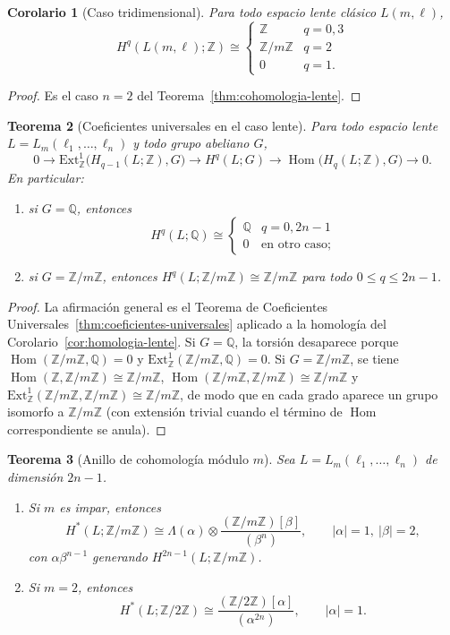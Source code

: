 \documentclass[11pt,a4paper]{article}
\theoremstyle{plain}
\newtheorem{theorem}{Teorema}[section]
\newtheorem{corollary}[theorem]{Corolario}
\theoremstyle{definition}
\theoremstyle{remark}
\newcommand{\ZZ}{\mathbb Z}
\newcommand{\QQ}{\mathbb Q}
\DeclareMathOperator{\Hom}{Hom}
\begin{document}
\begin{corollary}[Caso tridimensional]
\label{cor:cohomologia-lente-3d}
Para todo espacio lente clásico $L(m,\ell)$,
\[
H^q(L(m,\ell);\ZZ)\cong\begin{cases}\ZZ & q=0,3\\ \ZZ/m\ZZ & q=2\\0 & q=1.\end{cases}
\]
\end{corollary}

\begin{proof}
Es el caso $n=2$ del Teorema~\ref{thm:cohomologia-lente}.
\end{proof}

\begin{theorem}[Coeficientes universales en el caso lente]
\label{thm:ucl-lente}
Para todo espacio lente $L=L_m(\ell_1,\dots,\ell_n)$ y todo grupo abeliano
$G$,
\[
0\to\mathrm{Ext}^1_\ZZ\big(H_{q-1}(L;\ZZ),G\big)\to H^q(L;G)\to\Hom\big(H_q(L;\ZZ),G\big)\to0.
\]
En particular:
\begin{enumerate}[label=(\roman*)]
\item si $G=\QQ$, entonces
\[
H^q(L;\QQ)\cong\begin{cases}\QQ & q=0,2n-1\\0 & \text{en otro caso;}\end{cases}
\]
\item si $G=\ZZ/m\ZZ$, entonces $H^q(L;\ZZ/m\ZZ)\cong\ZZ/m\ZZ$ para todo
$0\le q\le2n-1$.
\end{enumerate}
\end{theorem}

\begin{proof}
La afirmación general es el Teorema de Coeficientes
Universales~\ref{thm:coeficientes-universales} aplicado a la homología del
Corolario~\ref{cor:homologia-lente}. Si $G=\QQ$, la torsión desaparece
porque $\Hom(\ZZ/m\ZZ,\QQ)=0$ y $\mathrm{Ext}^1_\ZZ(\ZZ/m\ZZ,\QQ)=0$. Si
$G=\ZZ/m\ZZ$, se tiene $\Hom(\ZZ,\ZZ/m\ZZ)\cong\ZZ/m\ZZ$,
$\Hom(\ZZ/m\ZZ,\ZZ/m\ZZ)\cong\ZZ/m\ZZ$ y
$\mathrm{Ext}^1_\ZZ(\ZZ/m\ZZ,\ZZ/m\ZZ)\cong\ZZ/m\ZZ$, de modo que en cada
grado aparece un grupo isomorfo a $\ZZ/m\ZZ$ (con extensión trivial cuando
el término de $\Hom$ correspondiente se anula).
\end{proof}

\begin{theorem}[Anillo de cohomología módulo $m$]
\label{thm:anillo-cohomologia-lente}
Sea $L=L_m(\ell_1,\dots,\ell_n)$ de dimensión $2n-1$.
\begin{enumerate}[label=(\roman*)]
\item Si $m$ es impar, entonces
\[
H^*(L;\ZZ/m\ZZ)\cong\Lambda(\alpha)\otimes\frac{(\ZZ/m\ZZ)[\beta]}{(\beta^n)},
\qquad |\alpha|=1,\ |\beta|=2,
\]
con $\alpha\beta^{n-1}$ generando $H^{2n-1}(L;\ZZ/m\ZZ)$.
\item Si $m=2$, entonces
\[
H^*(L;\ZZ/2\ZZ)\cong\frac{(\ZZ/2\ZZ)[\alpha]}{(\alpha^{2n})}, \qquad |\alpha|=1.
\]
\end{enumerate}
\end{theorem}
\end{document}
